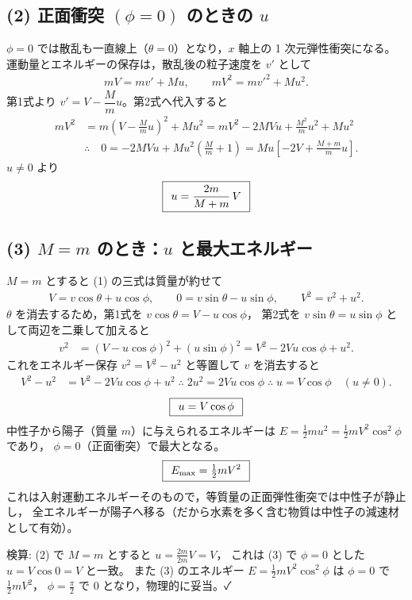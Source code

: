 \documentclass[11pt,a4paper]{article}
\begin{document}
\subsection*{(2) 正面衝突 $(\phi=0)$ のときの $u$}
$\phi=0$ では散乱も一直線上（$\theta=0$）となり，$x$ 軸上の 1 次元弾性衝突になる。
運動量とエネルギーの保存は，散乱後の粒子速度を $v'$ として
\begin{align*}
  mV = m v' + M u,\qquad
  mV^2 = m v'^2 + M u^2.
\end{align*}
第1式より $v'=V-\dfrac{M}{m}u$。第2式へ代入すると
\begin{align*}
  mV^2 &= m\!\left(V-\frac{M}{m}u\right)^{\!2}+M u^2
   = mV^2-2MVu+\frac{M^2}{m}u^2+M u^2\\
  &\therefore\quad 0=-2MVu+M u^2\!\left(\frac{M}{m}+1\right)
   = Mu\!\left[-2V+\frac{M+m}{m}u\right].
\end{align*}
$u\neq0$ より
\[
  \boxed{\,\;u=\dfrac{2m}{M+m}\,V\;\,}
\]

\subsection*{(3) $M=m$ のとき：$u$ と最大エネルギー}
$M=m$ とすると (1) の三式は質量が約せて
\begin{align*}
  V = v\cos\theta + u\cos\phi,\qquad
  0 = v\sin\theta - u\sin\phi,\qquad
  V^2 = v^2 + u^2.
\end{align*}
$\theta$ を消去するため，第1式を $v\cos\theta=V-u\cos\phi$，
第2式を $v\sin\theta=u\sin\phi$ として両辺を二乗して加えると
\begin{align*}
  v^2 &= (V-u\cos\phi)^2+(u\sin\phi)^2
       = V^2-2Vu\cos\phi+u^2.
\end{align*}
これをエネルギー保存 $v^2=V^2-u^2$ と等置して $v$ を消去すると
\begin{align*}
  V^2-u^2 &= V^2-2Vu\cos\phi+u^2
  \;\therefore\; 2u^2=2Vu\cos\phi
  \;\therefore\; u=V\cos\phi\quad(u\neq0).
\end{align*}
\[
  \boxed{\,\;u=V\cos\phi\;\,}
\]
中性子から陽子（質量 $m$）に与えられるエネルギーは
$E=\tfrac{1}{2}m u^2=\tfrac{1}{2}mV^2\cos^2\phi$ であり，
$\phi=0$（正面衝突）で最大となる。
\[
  \boxed{\,\;E_{\max}=\tfrac{1}{2}mV^2\;\,}
\]
これは入射運動エネルギーそのもので，等質量の正面弾性衝突では中性子が静止し，
全エネルギーが陽子へ移る（だから水素を多く含む物質は中性子の減速材として有効）。

\medskip
検算: (2) で $M=m$ とすると $u=\frac{2m}{2m}V=V$，
これは (3) で $\phi=0$ とした $u=V\cos0=V$ と一致。
また (3) のエネルギー $E=\frac12 mV^2\cos^2\phi$ は $\phi=0$ で $\frac12 mV^2$，
$\phi=\frac{\pi}{2}$ で $0$ となり，物理的に妥当。✓
\end{document}
